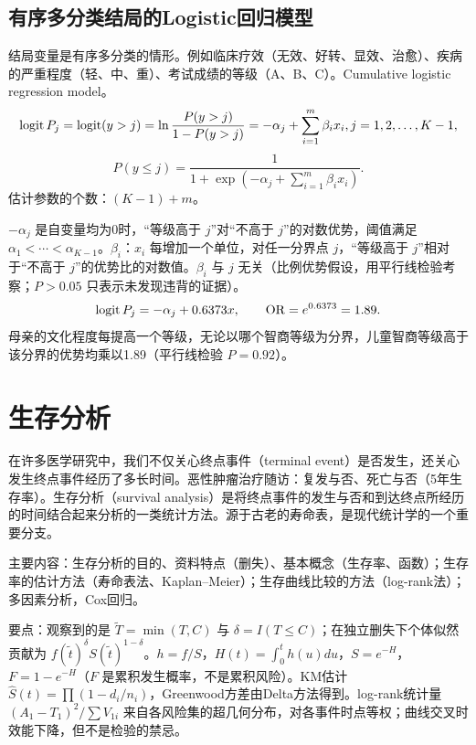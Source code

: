 \subsection{有序多分类结局的Logistic回归模型}
结局变量是有序多分类的情形。例如临床疗效（无效、好转、显效、治愈）、疾病的严重程度（轻、中、重）、考试成绩的等级（A、B、C）。Cumulative logistic regression model。
\[
\operatorname{logit} P_j=\operatorname{logit}(y>j)=\ln\frac{P(y>j)}{1-P(y>j)}
=-\alpha_j+\sum_{i=1}^m\beta_ix_i, j=1,2,\ldots,K-1,
\]
\[
P(y\le j)=\frac1{1+\exp(-\alpha_j+\sum_{i=1}^m\beta_ix_i)}.
\]
估计参数的个数：$(K-1)+m$。

$-\alpha_j$ 是自变量均为0时，“等级高于 $j$”对“不高于 $j$”的对数优势，阈值满足 $\alpha_1<\cdots<\alpha_{K-1}$。$\beta_i$：$x_i$ 每增加一个单位，对任一分界点 $j$，“等级高于 $j$”相对于“不高于 $j$”的优势比的对数值。$\beta_i$ 与 $j$ 无关（比例优势假设，用平行线检验考察；$P>0.05$ 只表示未发现违背的证据）。
\[
\operatorname{logit} P_j=-\alpha_j+0.6373x,\qquad\operatorname{OR}=e^{0.6373}=1.89.
\]
母亲的文化程度每提高一个等级，无论以哪个智商等级为分界，儿童智商等级高于该分界的优势均乘以1.89（平行线检验 $P=0.92$）。
\section{生存分析}
在许多医学研究中，我们不仅关心终点事件（terminal event）是否发生，还关心发生终点事件经历了多长时间。恶性肿瘤治疗随访：复发与否、死亡与否（5年生存率）。生存分析（survival analysis）是将终点事件的发生与否和到达终点所经历的时间结合起来分析的一类统计方法。源于古老的寿命表，是现代统计学的一个重要分支。

主要内容：生存分析的目的、资料特点（删失）、基本概念（生存率、函数）；生存率的估计方法（寿命表法、Kaplan--Meier）；生存曲线比较的方法（log-rank法）；多因素分析，Cox回归。

要点：观察到的是 $\widetilde T=\min(T,C)$ 与 $\delta=I(T\le C)$；在独立删失下个体似然贡献为 $f(\tilde t)^\delta S(\tilde t)^{1-\delta}$。$h=f/S$，$H(t)=\int_0^th(u)du$，$S=e^{-H}$，$F=1-e^{-H}$（$F$ 是累积发生概率，不是累积风险）。KM估计 $\widehat S(t)=\prod(1-d_i/n_i)$，Greenwood方差由Delta方法得到。log-rank统计量 $(A_1-T_1)^2/\sum V_{1i}$ 来自各风险集的超几何分布，对各事件时点等权；曲线交叉时效能下降，但不是检验的禁忌。
